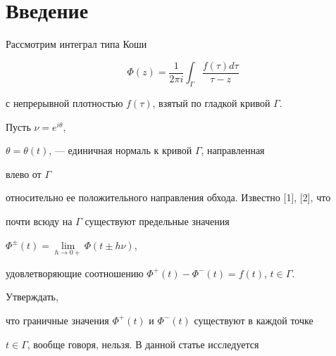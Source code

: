 

\pagestyle{plain} %


 




\maketitle 


\label{begin} 


 


 


 


 


\section*{Введение} 


 


Рассмотрим интеграл типа Коши 


\begin{equation} 


\Phi(z)=\frac{1}{2\pi i}\int_\Gamma 


\frac{f(\tau)d\tau}{\tau-z} 


\end{equation} 


с непрерывной плотностью $f(\tau)$, взятый по гладкой кривой $\Gamma$. 


Пусть $\nu=e^{i\theta}$, 


$\theta=\theta(t)$, --- единичная нормаль к кривой $\Gamma$, направленная 


влево от $\Gamma$ 


относительно ее положительного направления обхода. Известно [1], [2], что 


почти всюду на $\Gamma$ существуют предельные значения 


$\Phi^{\pm}(t)=\lim\limits_{h\to0+}\Phi(t\pm h\nu)$, 


удовлетворяющие соотношению $\Phi^+(t)-\Phi^-(t)=f(t)$, $t\in\Gamma$. 


Утверждать, 


что граничные значения $\Phi^+(t)$ и $\Phi^-(t)$ существуют в каждой точке 


$t\in\Gamma$, вообще говоря, нельзя. В данной статье исследуется 


